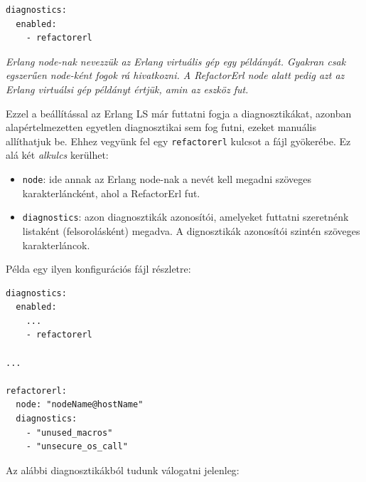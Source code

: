 \begin{lstlisting}
diagnostics:
  enabled:
    - refactorerl
\end{lstlisting}

\textit{Erlang node-nak nevezzük az Erlang virtuális gép egy példányát. Gyakran csak egszerűen node-ként fogok rá hivatkozni. A RefactorErl node alatt pedig azt az Erlang virtuálsi gép példányt értjük, amin az eszköz fut.}

Ezzel a beállítással az Erlang LS már futtatni fogja a diagnosztikákat, azonban alapértelmezetten egyetlen diagnosztikai sem fog futni, ezeket manuális allíthatjuk be. Ehhez vegyünk fel egy \lstinline{refactorerl} kulcsot a fájl gyökerébe. Ez alá két \textit{alkulcs} kerülhet:
\begin{itemize}
    \item \lstinline{node}: ide annak az Erlang node-nak a nevét kell megadni szöveges karakterláncként, ahol a RefactorErl fut. 
    \item \lstinline{diagnostics}: azon diagnosztikák azonosítói, amelyeket futtatni szeretnénk listaként (felsorolásként) megadva. A dignosztikák azonosítói szintén szöveges karakterláncok.
\end{itemize}

Példa egy ilyen konfigurációs fájl részletre:

\begin{lstlisting}
diagnostics:
  enabled:
    ...
    - refactorerl

...

refactorerl:
  node: "nodeName@hostName" 		
  diagnostics:
    - "unused_macros"			
    - "unsecure_os_call"
\end{lstlisting}

Az alábbi diagnosztikákból tudunk válogatni jelenleg:


